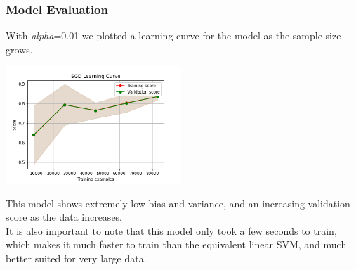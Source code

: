 \subsubsection{Model Evaluation}

With \emph{alpha}=0.01 we plotted a learning curve for the model as the sample size grows.
\begin{center}
    \captionsetup{type=figure}
    \includegraphics[width=250px]{SGD Learning Curve.png}
\end{center}
This model shows extremely low bias and variance, and an increasing validation score as the data increases.\\
It is also important to note that this model only took a few seconds to train, which makes it much faster to train than the equivalent linear SVM, and much better suited for very large data.
